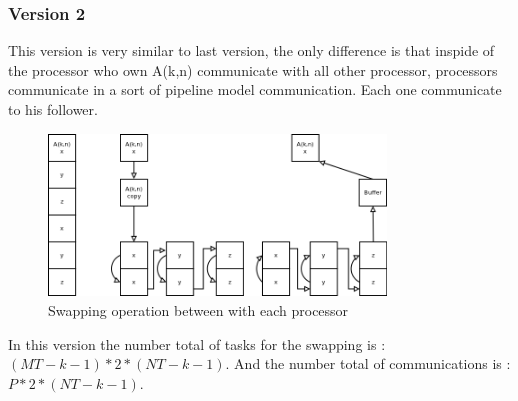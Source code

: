 \documentclass{report}
\begin{document}
\subsubsection*{Version 2}
This version is very similar to last version, the only difference is that inspide of the processor who own A(k,n) communicate with all other processor, processors communicate in a sort of pipeline model communication. Each one communicate to his follower.
\begin{figure}[!ht]
\begin{center}
\includegraphics[width=0.8\textwidth]{version2.png} 
\end{center}
\caption{Swapping operation between with each processor}
\end{figure}
In this version the number total of tasks for the swapping is : $(MT-k-1)*2*(NT-k-1)$.
And the number total of communications is : $P*2*(NT-k-1)$.
\end{document}
